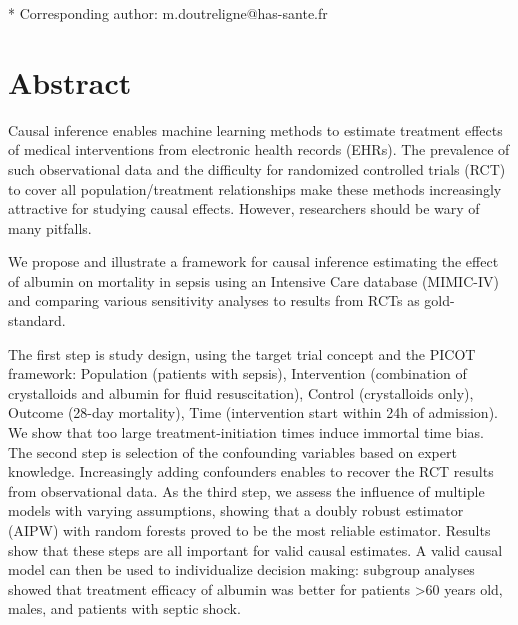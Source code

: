 \documentclass[10pt,letterpaper]{article}
\begin{document}
\begin{flushleft}



  * Corresponding author: m.doutreligne@has-sante.fr


\end{flushleft}
\section*{Abstract}

Causal inference enables machine learning methods to estimate treatment effects
of medical interventions from electronic health records (EHRs). The prevalence
of such observational data and the difficulty for randomized controlled trials (RCT) to cover all
population/treatment relationships make these methods increasingly attractive
for studying causal effects. However, researchers should be wary of many
pitfalls.

We propose and illustrate a framework for causal inference estimating the
effect of albumin on mortality in sepsis using an Intensive Care database
(MIMIC-IV) and comparing various sensitivity analyses to results from RCTs as gold-standard.

The first step is study design, using the target trial concept and the PICOT
framework: Population (patients with sepsis), Intervention (combination of
crystalloids and albumin for fluid resuscitation), Control (crystalloids only),
Outcome (28-day mortality), Time (intervention start within 24h of admission).
We show that too large treatment-initiation times induce immortal time bias.
The second step is selection of the confounding variables based on expert
knowledge. Increasingly adding confounders enables to recover the RCT results
from observational data. As the third step, we assess the influence
of multiple models with varying assumptions, showing that a doubly robust estimator (AIPW)
with random forests proved to be the most reliable estimator. Results show that
these steps are all important for valid causal estimates. A valid causal model
can then be used to individualize decision making: subgroup analyses showed that
treatment efficacy of albumin was better for patients >60 years old, males, and
patients with septic shock.
\end{document}
